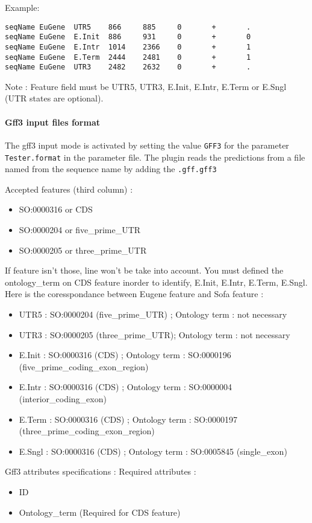 Example:
\begin{Verbatim}[fontsize=\small]
seqName EuGene  UTR5    866     885     0       +       .
seqName EuGene  E.Init  886     931     0       +       0
seqName EuGene  E.Intr  1014    2366    0       +       1
seqName EuGene  E.Term  2444    2481    0       +       1
seqName EuGene  UTR3    2482    2632    0       +       .
\end{Verbatim}
Note : Feature field must be UTR5, UTR3, E.Init, E.Intr, E.Term or E.Sngl (UTR states are optional).

\paragraph{Gff3 input files format}
The gff3 input mode is activated by setting the value \texttt{GFF3} for the parameter
\texttt{Tester.format} in the parameter file.
The plugin reads the predictions from a file 
named from the sequence name by adding the \texttt{.gff.gff3}

Accepted features (third column) :
\begin{itemize}
\item  SO:0000316 or CDS
\item  SO:0000204 or five\_prime\_UTR
\item  SO:0000205 or three\_prime\_UTR
\end{itemize}
If feature isn't those, line won't be take into account.
You must defined the ontology\_term on CDS feature inorder to identify, E.Init, E.Intr, E.Term, E.Sngl.
Here is the coresspondance between Eugene feature and Sofa feature :
\begin{itemize}
\item  UTR5 :  SO:0000204 (five\_prime\_UTR) ; Ontology term : not necessary
\item  UTR3 :  SO:0000205 (three\_prime\_UTR); Ontology term : not necessary
\item  E.Init : SO:0000316 (CDS)	     ; Ontology term : SO:0000196 	(five\_prime\_coding\_exon\_region)
\item  E.Intr : SO:0000316 (CDS)	     ; Ontology term : SO:0000004	(interior\_coding\_exon)
\item  E.Term : SO:0000316 (CDS)	     ; Ontology term : SO:0000197	(three\_prime\_coding\_exon\_region)
\item  E.Sngl : SO:0000316 (CDS)	     ; Ontology term : SO:0005845	(single\_exon)
\end{itemize}

Gff3 attributes specifications :
Required attributes : 
	\begin{itemize}
	\item ID
	\item Ontology\_term (Required for CDS feature)
	\end{itemize}

